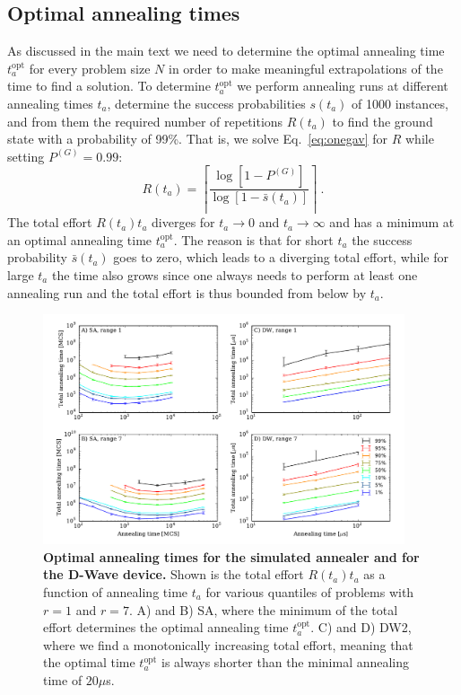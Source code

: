 \subsection{Optimal annealing times}
\label{sec:scaling-optimality}
As discussed in the main text we need to determine the optimal annealing time $t_a^{\textrm{opt}}$ for every problem size $N$ in order to make meaningful extrapolations of the time to find a solution. To determine $t_a^{\textrm{opt}}$ we perform annealing runs at different annealing times $t_a$, determine the success probabilities $s(t_a)$ of 1000 instances, and from them the required number of repetitions $R(t_a)$ to find the ground state with a probability of 99\%. That is, we solve Eq.~\eqref{eq:onegav} for $R$ while setting $P^{(G)} = 0.99$:
%
\begin{equation}
R(t_a) = \left\lceil\frac{\log[1-P^{(G)}]}{\log[1-\bar{s}(t_a)]}\right\rceil\ .
\label{eq:R}
\end{equation}
%
The total effort $R(t_a)t_a$ diverges for $t_a\rightarrow 0$ and $t_a\rightarrow\infty$ and has a minimum at an optimal annealing time $t_a^{\textrm{opt}}$. The reason is that for short $t_a$ the success probability $\bar{s}(t_a)$ goes to zero, which leads to a diverging total effort, while for large $t_a$ the time also grows since one always needs to perform at least one annealing run and the total effort is thus bounded from below by $t_a$.

\begin{figure}[t]
\includegraphics[width=0.95\textwidth]{chapters/Speedup/fig10.pdf}
\caption{{\bf Optimal annealing times for the simulated annealer and for the D-Wave device.} Shown is the total effort $R(t_a)t_a$ as a function of annealing time $t_a$ for various quantiles of problems with $r=1$ and $r=7$. A) and B) SA, where the minimum of the total effort determines the optimal annealing time $t_a^{\textrm{opt}}$.  C) and D) DW2, where we find a monotonically increasing total effort, meaning that the optimal time $t_a^{\textrm{opt}}$ is always shorter than the minimal annealing time of $20\mu$s.}
\label{fig:satopt}
\end{figure}
%


